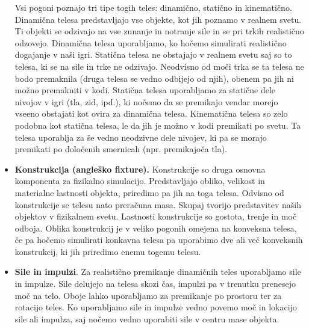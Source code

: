 \documentclass[12pt,a4paper,twoside]{book}
\begin{document}
\begin{itemize}
	Vsi pogoni poznajo tri tipe togih teles: dinamično, statično in kinematično. Dinamična telesa predstavljajo vse objekte, kot jih poznamo v realnem svetu. Ti objekti se odzivajo na vse zunanje in notranje sile in se pri trkih realistično odzovejo. Dinamična telesa uporabljamo, ko hočemo simulirati realistično dogajanje v naši igri. Statična telesa ne obstajajo v realnem svetu saj so to telesa, ki se na sile in trke ne odzivajo. Neodvisno od moči trka se ta telesa ne bodo premaknila (druga telesa se vedno odbijejo od njih), obenem pa jih ni možno premakniti v kodi. Statična telesa uporabljamo za statične dele nivojov v igri (tla, zid, ipd.), ki nočemo da se premikajo vendar morejo vseeno obstajati kot ovira za dinamična telesa. Kinematična telesa so zelo podobna kot statična telesa, le da jih je možno v kodi premikati po svetu. Ta telesa uporablja za še vedno neodzivne dele nivojev, ki pa se morajo premikati po določenih smernicah (npr. premikajoča tla).
	\item \textbf{Konstrukcija (angleško fixture).} Konstrukcije so druga osnovna komponenta za fizikalno simulacijo. Predstavljajo obliko, velikost in materialne lastnosti objekta, priredimo pa jih na toga telesa. Odvisno od konstrukcije se telesu nato preračuna masa. Skupaj tvorijo predstavitev naših objektov v fizikalnem svetu. Lastnosti konstrukcije so gostota, trenje in moč odboja. Oblika konstrukcij je v veliko pogonih omejena na konveksna telesa, če pa hočemo simulirati konkavna telesa pa uporabimo dve ali več konveksnih konstrukcij, ki jih priredimo enemu togemu telesu.
	\item \textbf{Sile in impulzi}. Za realistično premikanje dinamičnih teles uporabljamo sile in impulze. Sile delujejo na telesa skozi čas, impulzi pa v trenutku prenesejo moč na telo. Oboje lahko uporabljamo za premikanje po prostoru ter za rotacijo teles. Ko uporabljamo sile in impulze vedno povemo moč in lokacijo sile ali impulza, saj nočemo vedno uporabiti sile v centru mase objekta.
	

\end{itemize}
\end{document}
